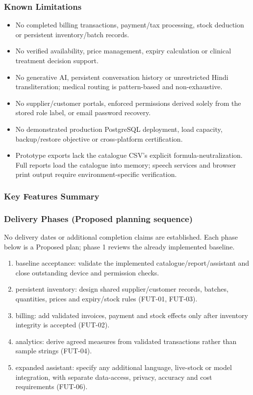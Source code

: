 \subsubsection{Known Limitations}
\begin{itemize}
\item No completed billing transactions, payment/tax processing, stock deduction or persistent inventory/batch records.
\item No verified availability, price management, expiry calculation or clinical treatment decision support.
\item No generative AI, persistent conversation history or unrestricted Hindi transliteration; medical routing is pattern-based and non-exhaustive.
\item No supplier/customer portals, enforced permissions derived solely from the stored role label, or email password recovery.
\item No demonstrated production PostgreSQL deployment, load capacity, backup/restore objective or cross-platform certification.
\item Prototype exports lack the catalogue CSV's explicit formula-neutralization. Full reports load the catalogue into memory; speech services and browser print output require environment-specific verification.
\end{itemize}

\subsubsection{Key Features Summary}
\subsubsection{Delivery Phases (Proposed planning sequence)}
No delivery dates or additional completion claims are established. Each phase below is a Proposed plan; phase 1 reviews the already implemented baseline.
\begin{enumerate}
\item \Proposed{} baseline acceptance: validate the implemented catalogue/report/assistant and close outstanding device and permission checks.
\item \Proposed{} persistent inventory: design shared supplier/customer records, batches, quantities, prices and expiry/stock rules (FUT-01, FUT-03).
\item \Proposed{} billing: add validated invoices, payment and stock effects only after inventory integrity is accepted (FUT-02).
\item \Proposed{} analytics: derive agreed measures from validated transactions rather than sample strings (FUT-04).
\item \Proposed{} expanded assistant: specify any additional language, live-stock or model integration, with separate data-access, privacy, accuracy and cost requirements (FUT-06).
\end{enumerate}
